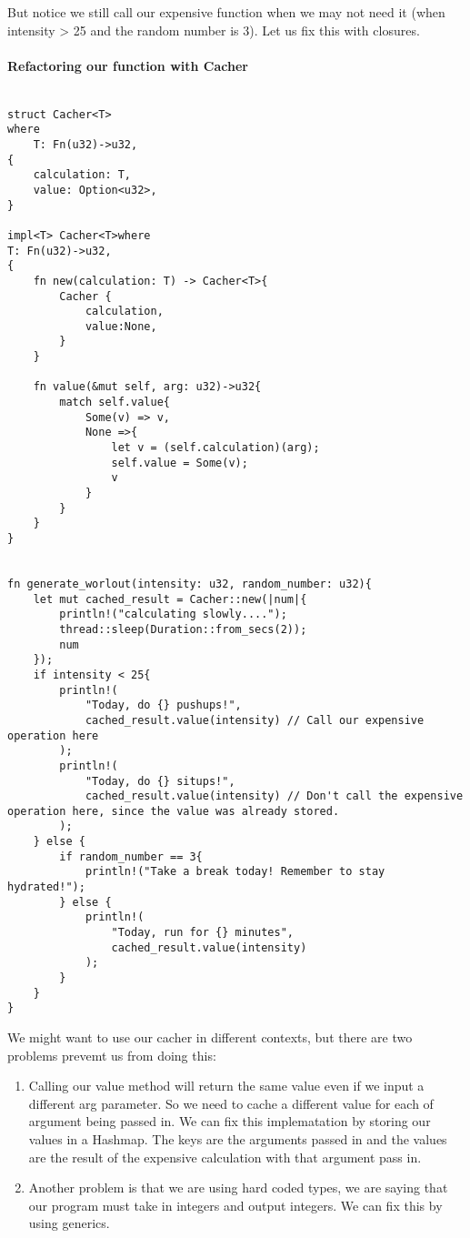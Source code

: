 \begin{example}
But notice we still call our expensive function when we may not need it (when intensity > 25 and the random number is 3). Let us fix this with closures.

\paragraph*{Refactoring our function with Cacher}\begin{lstlisting}
    
struct Cacher<T>
where 
    T: Fn(u32)->u32, 
{
    calculation: T, 
    value: Option<u32>,
}

impl<T> Cacher<T>where 
T: Fn(u32)->u32, 
{
    fn new(calculation: T) -> Cacher<T>{
        Cacher { 
            calculation, 
            value:None,
        }
    }

    fn value(&mut self, arg: u32)->u32{
        match self.value{
            Some(v) => v,
            None =>{
                let v = (self.calculation)(arg);
                self.value = Some(v);
                v
            }
        }
    }
}


fn generate_worlout(intensity: u32, random_number: u32){
    let mut cached_result = Cacher::new(|num|{ 
        println!("calculating slowly....");
        thread::sleep(Duration::from_secs(2));
        num
    });
    if intensity < 25{
        println!(
            "Today, do {} pushups!", 
            cached_result.value(intensity) // Call our expensive operation here
        );
        println!(
            "Today, do {} situps!", 
            cached_result.value(intensity) // Don't call the expensive operation here, since the value was already stored.
        );
    } else {
        if random_number == 3{
            println!("Take a break today! Remember to stay hydrated!");
        } else {
            println!(
                "Today, run for {} minutes",
                cached_result.value(intensity)
            );
        }
    }
}
\end{lstlisting}
We might want to use our cacher in different contexts, but there are two problems prevemt us from doing this:\begin{enumerate}
    \item Calling our value method will return the same value even if we input a different arg parameter. So we need to cache a different value for each of argument being passed in. We can fix this implematation by storing our values in a Hashmap. The keys are the arguments passed in and the values are the result of the expensive calculation with that argument pass in.
    \item  Another problem is that we are using hard coded types, we are saying that our program must take in integers and output integers. We can fix this by using generics.
\end{enumerate}
\end{example}

